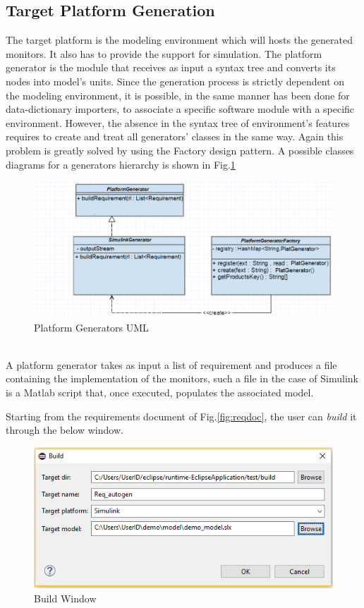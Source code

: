 \subsection{Target Platform Generation}
\label{sec:tagetgen}

The target platform is the modeling environment which will hosts the generated monitors. It also has to provide the support for simulation. The platform generator is the module that receives as input a syntax tree and converts its nodes into model's units. Since the generation process is strictly dependent on the modeling environment, it is possible, in the same manner has been done for data-dictionary importers, to associate a specific software module with a specific environment. However, the absence in the syntax tree of environment's features requires to create and treat all generators' classes in the same way. Again this problem is greatly solved by using the Factory design pattern. A possible classes diagrams for a generators hierarchy is shown in Fig.\ref{fig:genuml}

\begin{figure}[h]
\centering
\includegraphics[width=.8\textwidth]{Figs/generatorUML.png}
\caption{Platform Generators UML}
\label{fig:genuml}
\end{figure}
\noindent
\\
A platform generator takes as input a list of requirement and produces a file containing the implementation of the monitors, such a file in the case of Simulink is a Matlab script that, once executed, populates the associated model. 
\par Starting from the requirements document of Fig.\ref{fig:reqdoc}, the user can \textit{build} it through the below window.

\begin{figure}[!h]
\centering
\includegraphics[width=.4\textwidth]{Figs/buildwin.PNG}
\caption{Build Window}
\label{fig:buildwin}
\end{figure}

